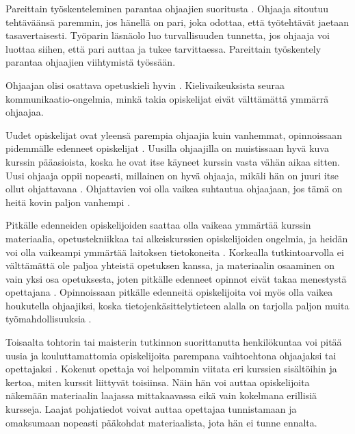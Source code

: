 \documentclass[finnish]{tktltiki2}
\theoremstyle{definition}
\theoremstyle{remark}
\begin{document}
Pareittain työskenteleminen parantaa ohjaajien suoritusta \cite{Patitsas12_3}. Ohjaaja sitoutuu tehtäväänsä paremmin, jos hänellä on pari, joka odottaa, että työtehtävät jaetaan tasavertaisesti. Työparin läsnäolo luo turvallisuuden tunnetta, jos ohjaaja voi luottaa siihen, että pari auttaa ja tukee tarvittaessa. Pareittain työskentely parantaa ohjaajien viihtymistä työssään. \par

Ohjaajan olisi osattava opetuskieli hyvin \cite{Richards00}. Kielivaikeuksista seuraa kom\-mu\-ni\-kaa\-tio-on\-gel\-mia, minkä takia opiskelijat eivät välttämättä ymmärrä ohjaajaa. \par

Uudet opiskelijat ovat yleensä parempia ohjaajia kuin vanhemmat, opinnoissaan pidemmälle edenneet opiskelijat \cite{Dickson11}. Uusilla ohjaajilla on muistissaan hyvä kuva kurssin pääasioista, koska he ovat itse käyneet kurssin vasta vähän aikaa sitten. Uusi ohjaaja oppii nopeasti, millainen on hyvä ohjaaja, mikäli hän on juuri itse ollut ohjattavana \cite{Vihavainen, Vikberg}. Ohjattavien voi olla vaikea suhtautua ohjaajaan, jos tämä on heitä kovin paljon vanhempi \cite{Decker06}. \par

Pitkälle edenneiden opiskelijoiden saattaa olla vaikeaa ymmärtää kurssin materiaalia, opetustekniikkaa tai alkeiskurssien opiskelijoiden ongelmia, ja heidän voi olla vaikeampi ymmärtää laitoksen tietokoneita \cite{Reges88}. Korkealla tutkintoarvolla ei välttämättä ole paljoa yhteistä opetuksen kanssa, ja materiaalin osaaminen on vain yksi osa opetuksesta, joten pitkälle edenneet opinnot eivät takaa menestystä opettajana \cite{Baldwin00}. Opinnoissaan pitkälle edenneitä opiskelijoita voi myös olla vaikea houkutella ohjaajiksi, koska tietojenkäsittelytieteen alalla on tarjolla paljon muita työmahdollisuuksia \cite{Kay98}.  \par

Toisaalta tohtorin tai maisterin tutkinnon suorittanutta henkilökuntaa voi pitää uusia ja kouluttamattomia opiskelijoita parempana vaihtoehtona ohjaajaksi tai opettajaksi \cite{Baldwin00}. Kokenut opettaja voi helpommin viitata eri kurssien sisältöihin ja kertoa, miten kurssit liittyvät toisiinsa. Näin hän voi auttaa opiskelijoita näkemään materiaalin laajassa mittakaavassa eikä vain kokelmana erillisiä kursseja. Laajat pohjatiedot voivat auttaa opettajaa tunnistamaan ja omaksumaan nopeasti pääkohdat materiaalista, jota hän ei tunne ennalta. \par
\end{document}
